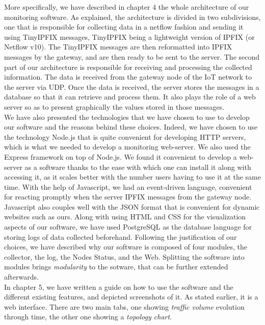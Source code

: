 More specifically, we have described in chapter 4 the whole architecture of our monitoring software. As explained, the architecture is divided in two subdivisions, one that is responsible for collecting data in a netflow fashion and sending it using TinyIPFIX messages, TinyIPFIX being a lightweight version of IPFIX (or Netflow v10). The TinyIPFIX messages are then reformatted into IPFIX messages by the gateway, and are then ready to be sent to the server. The second part of our architecture is responsible for receiving and processing the collected information. The data is received from the gateway node of the IoT network to the server via UDP. Once the data is received, the server stores the messages in a database so that it can retrieve and process them. It also plays the role of a web server so as to present graphically the values stored in those messages. \\

We have also presented the technologies that we have chosen to use to develop our software and the reasons behind these choices. Indeed, we have chosen to use the technology Node.js that is quite convenient for developing HTTP servers, which is what we needed to develop a monitoring web-server. We also used the Express framework on top of Node.js. We found it convenient to develop a web-server as a software thanks to the ease with which one can install it along with accessing it, as it scales better with the number users having to use it at the same time. With the help of Javascript, we had an event-driven language, convenient for reacting promptly when the server IPFIX messages from the gateway node. Javascript also couples well with the JSON format that is convenient for dynamic websites such as ours. Along with using HTML and CSS for the visualization aspects of our software, we have used PostgreSQL as the database language for storing logs of data collected beforehand. Following the justification of our choices, we have described why our software is composed of four modules, the collector, the log, the Nodes Status, and the Web. Splitting the software into modules brings \textit{modularity} to the sotware, that can be further extended afterwards.\\

In chapter 5, we have written a guide on how to use the software and the different existing features, and depicted screenshots of it. As stated earlier, it is a web interface. There are two main tabs, one showing \textit{traffic volume} evolution through time, the other one showing a \textit{topology chart}. \\

